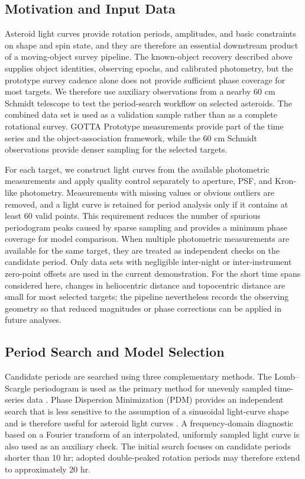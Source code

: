 \documentclass[referee]{raa}
\begin{document}
\subsection{Motivation and Input Data}

Asteroid light curves provide rotation periods, amplitudes, and basic constraints on shape and spin state, and they are therefore an essential downstream product of a moving-object survey pipeline. The known-object recovery described above supplies object identities, observing epochs, and calibrated photometry, but the prototype survey cadence alone does not provide sufficient phase coverage for most targets. We therefore use auxiliary observations from a nearby 60 cm Schmidt telescope to test the period-search workflow on selected asteroids. The combined data set is used as a validation sample rather than as a complete rotational survey. GOTTA Prototype measurements provide part of the time series and the object-association framework, while the 60 cm Schmidt observations provide denser sampling for the selected targets.

For each target, we construct light curves from the available photometric measurements and apply quality control separately to aperture, PSF, and Kron-like photometry. Measurements with missing values or obvious outliers are removed, and a light curve is retained for period analysis only if it contains at least 60 valid points. This requirement reduces the number of spurious periodogram peaks caused by sparse sampling and provides a minimum phase coverage for model comparison. When multiple photometric measurements are available for the same target, they are treated as independent checks on the candidate period. Only data sets with negligible inter-night or inter-instrument zero-point offsets are used in the current demonstration. For the short time spans considered here, changes in heliocentric distance and topocentric distance are small for most selected targets; the pipeline nevertheless records the observing geometry so that reduced magnitudes or phase corrections can be applied in future analyses.

\subsection{Period Search and Model Selection}

Candidate periods are searched using three complementary methods. The Lomb--Scargle periodogram is used as the primary method for unevenly sampled time-series data \citep{Lomb1976,Scargle1982}. Phase Dispersion Minimization (PDM) provides an independent search that is less sensitive to the assumption of a sinusoidal light-curve shape and is therefore useful for asteroid light curves \citep{Stellingwerf1978,Warner2009}. A frequency-domain diagnostic based on a Fourier transform of an interpolated, uniformly sampled light curve is also used as an auxiliary check. The initial search focuses on candidate periods shorter than 10 hr; adopted double-peaked rotation periods may therefore extend to approximately 20 hr.
\end{document}
